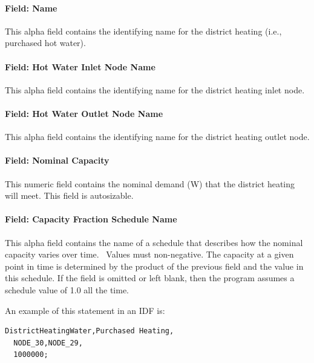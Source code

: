 \paragraph{Field: Name}\label{field-name-16-006}

This alpha field contains the identifying name for the district heating (i.e., purchased hot water).

\paragraph{Field: Hot Water Inlet Node Name}\label{field-hot-water-inlet-node-name-2}

This alpha field contains the identifying name for the district heating inlet node.

\paragraph{Field: Hot Water Outlet Node Name}\label{field-hot-water-outlet-node-name-2}

This alpha field contains the identifying name for the district heating outlet node.

\paragraph{Field: Nominal Capacity}\label{field-nominal-capacity-11}

This numeric field contains the nominal demand (W) that the district heating will meet. This field is autosizable.

\paragraph{Field: Capacity Fraction Schedule Name}\label{field-capacity-fraction-schedule-name-1}

This alpha field contains the name of a schedule that describes how the nominal capacity varies over time.~ Values must non-negative. The capacity at a given point in time is determined by the product of the previous field and the value in this schedule. If the field is omitted or left blank, then the program assumes a schedule value of 1.0 all the time.

An example of this statement in an IDF is:

\begin{lstlisting}
DistrictHeatingWater,Purchased Heating,
  NODE_30,NODE_29,
  1000000;
\end{lstlisting}


